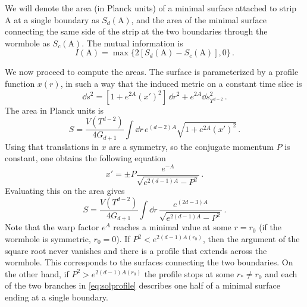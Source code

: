 We will denote the area (in Planck units) of a minimal surface attached to strip A at a single boundary as $S_d(\text{A})$, and the area of the minimal surface connecting the same side of the strip at the two boundaries through the wormhole as $S_c(\text{A})$.
The mutual information is
\begin{equation}
	I(\text{A})=\max\Big\{2 \left[S_d(\text{A})-S_c(\text{A})\right],0\Big\}\,.
\end{equation}

We now proceed to compute the areas.
The surface is parameterized by a profile function $x(r)$, in such a way that the induced metric on a constant time slice is
\begin{equation}
	\dd s^2
	=
	\left[1+e^{2A}(x')^2\right]\, \dd r^2+e^{2A}\dd s^2_{T^{d-2}}\,.
\end{equation}
The area in Planck units is
\begin{equation}
	S=\frac{V(T^{d-2})}{4 G_{d+1}}\int \dd r\, e^{(d-2)A}\sqrt{1+e^{2A}(x')^2}\,.
\end{equation}
Using that translations in $x$ are a symmetry, so the conjugate momentum $P$ is constant, one obtains the following equation
\begin{equation}\label{eq:solprofile}
	x'=\pm P\frac{e^{-A}}{\sqrt{e^{2(d-1)A}-P^2}}\,.
\end{equation}
Evaluating this on the area gives
\begin{equation}
S= \frac{V(T^{d-2})}{4 G_{d+1}}\int \dd r\, \frac{e^{(2d-3)A}}{\sqrt{e^{2(d-1)A}-P^2}}\,.
\end{equation}
Note that the warp factor $e^A$ reaches a minimal value at some $r=r_0$ (if the wormhole is symmetric, $r_0=0$).
If $P^2< e^{2(d-1)A(r_0)}$, then the argument of the square root never vanishes and there is a profile that extends across the wormhole.
This corresponds to the surfaces connecting the two boundaries.
On the other hand, if $P^2> e^{2(d-1)A(r_0)}$ the profile stops at some $r_*\neq r_0$ and each of the two branches in \cref{eq:solprofile} describes one half of a minimal surface ending at a single boundary.

